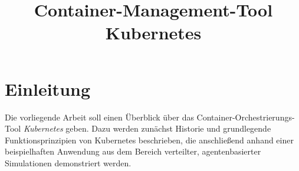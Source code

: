 \documentclass[11pt,a4paper]{article}
\title{Container-Management-Tool Kubernetes}
\begin{document}

\tableofcontents
\thispagestyle{empty}
\newpage



\clearpage
{}
\section{Einleitung}
\label{sec:einleitung}
Die vorliegende Arbeit soll einen Überblick über das Container-\linebreak Orchestrierungs-Tool \emph{Kubernetes} geben.
Dazu werden zunächst Historie und grundlegende Funktionsprinzipien von Kubernetes beschrieben, die anschließend
anhand einer beispielhaften Anwendung aus dem Bereich verteilter, agentenbasierter Simulationen demonstriert werden.
\end{document}
